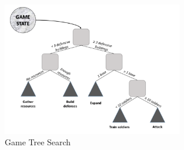 \begin{figure}[htb]
    \centering
    \includegraphics[width=0.7\textwidth]{images/game_tree_search.png}
    \caption{Game Tree Search\cite{barriga2018game}}
    \label{figure:game_tree_search}
\end{figure}